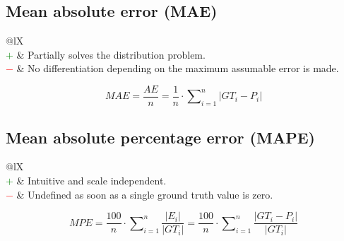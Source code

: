 \documentclass{article}
\begin{document}
\subsection[Mean absolute error (MAE)]{Mean absolute error (MAE) \cite{willmott2005advantages, hyndman2006another}}

\begin{table}[H]\centering
    \begin{tabularx}{\textwidth}{@{}lX}
        \multicolumn{2}{@{}X}{Calculates the mean of the sum (total) of all absolute errors. (range: $[0, \infty)$)} \\
        \textcolor{Green}{$+$} & Partially solves the distribution problem. \\
        \textcolor{Red}{$-$}   & No differentiation depending on the maximum assumable error is made.
    \end{tabularx}
\end{table}

\begin{equation}
    \textit{MAE} = \dfrac{\textit{AE}}{n} = \dfrac{1}{n} \cdot \sum\nolimits_{i = 1}^n |\textit{GT}_i - P_i|
%
    \label{equation:MAE}
\end{equation}


\subsection[Mean absolute percentage error (MAPE)]{Mean absolute percentage error (MAPE) \cite{armstrong1992error, hyndman2006another}}

\begin{table}[H]\centering
    \begin{tabularx}{\textwidth}{@{}lX}
        \multicolumn{2}{@{}X}{The average over all absolute error measurements in percentage. (range: $[0\%, \infty\%)$)} \\
        \textcolor{Green}{$+$} & Intuitive and scale independent. \\
        \textcolor{Red}{$-$}   & Undefined as soon as a single ground truth value is zero.
    \end{tabularx}
\end{table}

\begin{equation}
    \textit{MPE} = \dfrac{100}{n} \cdot \sum\nolimits_{i = 1}^n \dfrac{|E_i|}{|\textit{GT}_i|} = \dfrac{100}{n} \cdot \sum\nolimits_{i = 1}^n \dfrac{|\textit{GT}_i - P_i|}{|\textit{GT}_i|}
%
    \label{equation:MAPE}
\end{equation}
\end{document}
